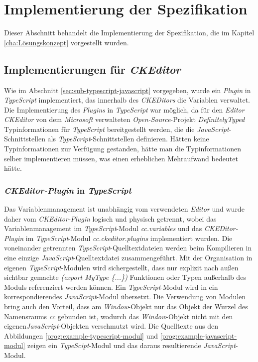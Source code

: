 \section{Implementierung der Spezifikation}
Dieser Abschnitt behandelt die Implementierung der Spezifikation, die im Kapitel \ref{cha:Lösungskonzept} vorgestellt wurden. 

\subsection{Implementierungen für \emph{CKEditor}}
Wie im Abschnitt \ref{sec:sub-typescript-javascript} vorgegeben, wurde ein \emph{Plugin} in \emph{TypeScript} implementiert, das innerhalb des \emph{CKEDitors} die Variablen verwaltet. Die Implementierung des \emph{Plugins} in \emph{TypeScript} war möglich, da für den \emph{Editor CKEditor} von dem \emph{Microsoft} verwalteten \emph{Open-Source}-Projekt \emph{DefinitelyTyped} Typinformationen für \emph{TypeScript} bereitgestellt werden, die die \emph{JavaScript}-Schnittstellen als \emph{TypeScript}-Schnittstellen definieren. Hätten keine Typinformationen zur Verfügung gestanden, hätte man die Typinformationen selber implementieren müssen, was einen erheblichen Mehraufwand bedeutet hätte.
 
\subsubsection{\emph{CKEditor-Plugin} in \emph{TypeScript}}
Das Variablenmanagement ist unabhängig vom verwendeten \emph{Editor} und wurde daher vom \emph{CKEditor-Plugin} logisch und physisch getrennt, wobei das Variablenmanagement im \emph{TypeScript}-Modul \emph{cc.variables} und das \emph{CKEDitor-Plugin} im \emph{TypeScript}-Modul \emph{cc.ckeditor.plugins} implementiert wurden. Die voneinander getrennten \emph{TypeScript}-Quelltextdateien werden beim Kompilieren in eine einzige \emph{JavaScript}-Quelltextdatei zusammengeführt. Mit der Organisation in eigenen \emph{TypeScript}-Modulen wird sichergestellt, dass nur explizit nach außen sichtbar gemachte \emph{(export MyType \{...\})} Funktionen oder Typen außerhalb des Moduls referenziert werden können. Ein \emph{TypeScript}-Modul wird in ein korrespondierendes \emph{JavaScript}-Modul übersetzt. Die Verwendung von Modulen bring auch den Vorteil, dass am \emph{Window}-Objekt nur das Objekt der Wurzel des Namensraums \emph{cc} gebunden ist, wodurch das \emph{Window}-Objekt nicht mit den eigenen\emph{JavaScript}-Objekten verschmutzt wird. Die Quelltexte aus den Abbildungen \ref{prog:example-typescript-modul} und \ref{prog:example-javascript-modul} zeigen ein \emph{TypeScipt}-Modul und das daraus resultierende \emph{JavaScript}-Modul.
\newpage

